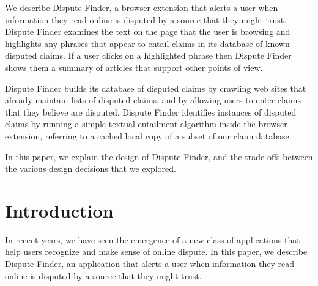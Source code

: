 \documentclass{www2010-submission}
\newcommand{\todo}[1]{}
\begin{document}
\abstract

We describe Dispute Finder, a browser extension that alerts a user when information they read online is disputed by a source that they might trust. Dispute Finder examines the text on the page that the user is browsing and highlights any phrases that appear to entail claims in its database of known disputed claims. If a user clicks on a highlighted phrase then Dispute Finder shows them a summary of articles that support other points of view.

Dispute Finder builds its database of disputed claims by crawling web sites that already maintain lists of disputed claims, and by allowing users to enter claims that they believe are disputed. Dispute Finder identifies instances of disputed claims by running a simple textual entailment algorithm inside the browser extension, referring to a cached local copy of a subset of our claim database.

In this paper, we explain the design of Dispute Finder, and the trade-offs between the various design decisions that we explored. 






\section{Introduction}

\todo{update screenshots}
\todo{should this be spun as about news, or information in general}
\todo{need to talk more about what we know about people}
 

In recent years, we have seen the emergence of a new class of applications that help users recognize and make sense of online dispute. In this paper, we describe Dispute Finder, an application that alerts a user when information they read online is disputed by a source that they might trust.
\end{document}
